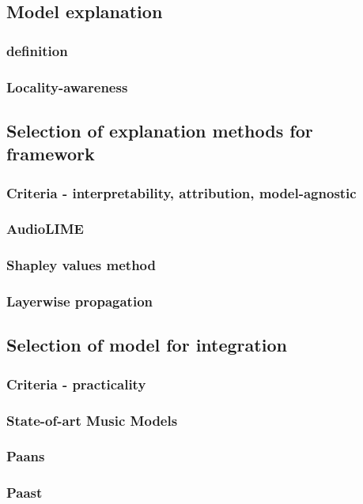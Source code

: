 \documentclass[
    bindingoffset=5mm,  %
    footnoteindent=3mm, %
    hyphenation=true    %
]{src/wut-thesis}
\begin{document}
\subsection{Model explanation}
\subsubsection{definition}
\subsubsection{Locality-awareness}

\subsection{Selection of explanation methods for framework}
\subsubsection{Criteria - interpretability, attribution, model-agnostic}
\subsubsection{AudioLIME}
\subsubsection{Shapley values method}
\subsubsection{Layerwise propagation}

\subsection{Selection of model for integration}
\subsubsection{Criteria - practicality}
\subsubsection{State-of-art Music Models}
\subsubsection{Paans}
\subsubsection{Paast}
\end{document}
